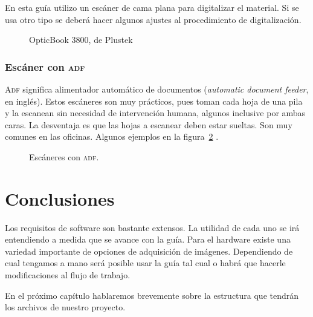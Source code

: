 \documentclass[%
	a5paper,
	10pt,
	twoside,
	openright,
	final,
]{memoir}
\begin{document}
{	En esta guía utilizo un escáner de cama plana para digitalizar el material. Si se usa otro tipo se deberá hacer algunos ajustes al procedimiento de digitalización.

	\begin{figure}
		\hfill
		\caption[OpticBook 3800]{OpticBook 3800, de Plustek\label{fig:scannerOpticBook3800}}
	\end{figure}

	\subsubsection{Escáner con \texorpdfstring{\textsc{adf}}{ADF}} \textsc{Adf} significa alimentador automático de documentos (\emph{automatic document feeder}, en inglés). Estos escáneres son muy prácticos, pues toman cada hoja de una pila y la escanean sin necesidad de intervención humana, algunos inclusive por ambas caras. La desventaja es que las hojas a escanear deben estar sueltas. Son muy comunes en las oficinas. Algunos ejemplos en la figura~\ref{fig:scannerADF} \cite{Workforce, ScanJetPro2500}.

	\begin{figure}
		\hspace*{\fill}
		\hfill
		\hspace*{\fill}
		\caption{Escáneres con \textsc{adf}\label{fig:scannerADF}.}
	\end{figure}

	\section{Conclusiones} Los requisitos de software son bastante extensos. La utilidad de cada uno se irá entendiendo a medida que se avance con la guía. Para el hardware existe una variedad importante de opciones de adquisición de imágenes. Dependiendo de cual tengamos a mano será posible usar la guía tal cual o habrá que hacerle modificaciones al flujo de trabajo.

	En el próximo capítulo hablaremos brevemente sobre la estructura que tendrán los archivos de nuestro proyecto.

}
\end{document}

